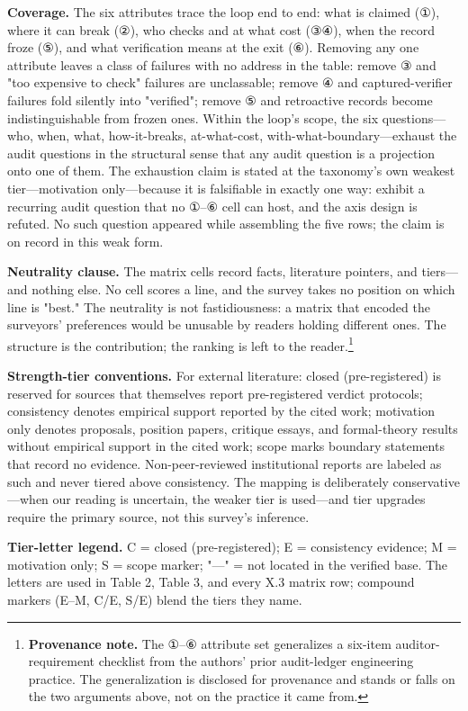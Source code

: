 \documentclass[11pt,a4paper]{article}
\begin{document}
\textbf{Coverage.} The six attributes trace the loop end to end: what is claimed (①), where it can break (②), who checks and at what cost (③④), when the record froze (⑤), and what verification means at the exit (⑥). Removing any one attribute leaves a class of failures with no address in the table: remove ③ and "too expensive to check" failures are unclassable; remove ④ and captured-verifier failures fold silently into "verified"; remove ⑤ and retroactive records become indistinguishable from frozen ones. Within the loop's scope, the six questions—who, when, what, how-it-breaks, at-what-cost, with-what-boundary—exhaust the audit questions in the structural sense that any audit question is a projection onto one of them. The exhaustion claim is stated at the taxonomy's own weakest tier—motivation only—because it is falsifiable in exactly one way: exhibit a recurring audit question that no ①–⑥ cell can host, and the axis design is refuted. No such question appeared while assembling the five rows; the claim is on record in this weak form.

\textbf{Neutrality clause.} The matrix cells record facts, literature pointers, and tiers—and nothing else. No cell scores a line, and the survey takes no position on which line is "best." The neutrality is not fastidiousness: a matrix that encoded the surveyors' preferences would be unusable by readers holding different ones. The structure is the contribution; the ranking is left to the reader.\footnote{\textbf{Provenance note.} The ①–⑥ attribute set generalizes a six-item auditor-requirement checklist from the authors' prior audit-ledger engineering practice. The generalization is disclosed for provenance and stands or falls on the two arguments above, not on the practice it came from.}

\textbf{Strength-tier conventions.} For external literature: closed (pre-registered) is reserved for sources that themselves report pre-registered verdict protocols; consistency denotes empirical support reported by the cited work; motivation only denotes proposals, position papers, critique essays, and formal-theory results without empirical support in the cited work; scope marks boundary statements that record no evidence. Non-peer-reviewed institutional reports are labeled as such and never tiered above consistency. The mapping is deliberately conservative—when our reading is uncertain, the weaker tier is used—and tier upgrades require the primary source, not this survey's inference.

\textbf{Tier-letter legend.} C = closed (pre-registered); E = consistency evidence; M = motivation only; S = scope marker; "—" = not located in the verified base. The letters are used in Table 2, Table 3, and every X.3 matrix row; compound markers (E–M, C/E, S/E) blend the tiers they name.
\end{document}
